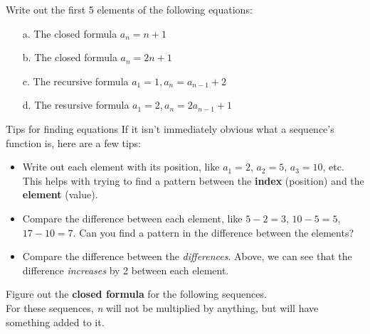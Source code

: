 {    %
    \begin{questionNOGRADE}{\thequestion}
        Write out the first 5 elements of the following equations: \\
        \begin{itemize}
            \item[a.]   The closed formula $a_{n} = n+1$
            \item[b.]   The closed formula $a_{n} = 2n+1$
            \item[c.]   The recursive formula $a_{1} = 1, a_{n} = a_{n-1} + 2$
            \item[d.]   The resursive formula $a_{1} = 2, a_{n} = 2 a_{n-1} + 1$
        \end{itemize}
    \end{questionNOGRADE}

    \newpage
    
    \begin{hint}{Tips for finding equations}
        If it isn't immediately obvious what a sequence's function is, here are a few tips:
        
        \begin{itemize}
            \item Write out each element with its position, like
            $a_{1} = 2$, $a_{2} = 5$, $a_{3} = 10$, etc. This helps
            with trying to find a pattern between the \textbf{index} (position)
            and the \textbf{element} (value).
            
            \item Compare the difference between each element, like
            $5 - 2 = 3$, $10 - 5 = 5$, $17 - 10 = 7$. Can you find a pattern
            in the difference between the elements?
            
            \item Compare the difference between the \textit{differences}.
            Above, we can see that the difference \textit{increases}
            by 2 between each element.
        \end{itemize}
    \end{hint}

    \begin{questionNOGRADE}{\thequestion}
        Figure out the \textbf{closed formula} for the following sequences. \\
        For these sequences, \textit{n} will not be multiplied
        by anything, but will have something added to it.


\end{questionNOGRADE}}
